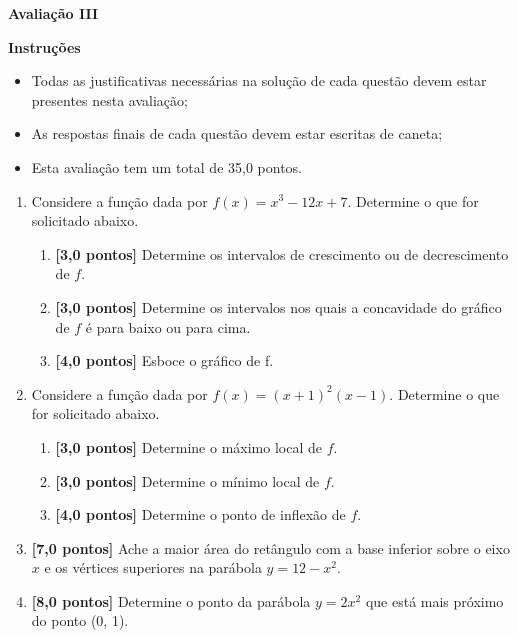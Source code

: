 \documentclass[12pt,a4paper]{article}
\begin{document}
\begin{center}
 \textbf{Avaliação III}
\end{center}

\textbf{Instruções}
\begin{itemize}
 \item Todas as justificativas necessárias na solução de cada questão devem estar presentes nesta avaliação;
 \item As respostas finais de cada questão devem estar escritas de caneta;
 \item Esta avaliação tem um total de 35,0 pontos.
\end{itemize}

\begin{enumerate}
  \item Considere a função dada por $f(x) = x^3 - 12x + 7$. 
    Determine o que for solicitado abaixo.
  
    \begin{enumerate}
      \item \textbf{[3,0 pontos]} Determine os intervalos de crescimento ou de decrescimento de $f$.
      \item \textbf{[3,0 pontos]} Determine os intervalos nos quais a concavidade do gráfico de $f$ é para baixo
        ou para cima.
      \item \textbf{[4,0 pontos]} Esboce o gráfico de f.
    \end{enumerate}

  \item Considere a função dada por $f(x) = (x + 1)^2(x - 1)$.
    Determine o que for solicitado abaixo.
  
    \begin{enumerate}
      \item \textbf{[3,0 pontos]} Determine o máximo local de $f$.
      \item \textbf{[3,0 pontos]} Determine o mínimo local de $f$.
      \item \textbf{[4,0 pontos]} Determine o ponto de inflexão de $f$.
    \end{enumerate}
   
  \item \textbf{[7,0 pontos]} Ache a maior área do retângulo com a base inferior
    sobre o eixo $x$ e os vértices superiores na parábola $y = 12 - x^2$.

  \item \textbf{[8,0 pontos]} Determine o ponto da parábola $y = 2x^2$ que está mais próximo do ponto (0, 1). 
    
  \end{enumerate}
\end{document}
